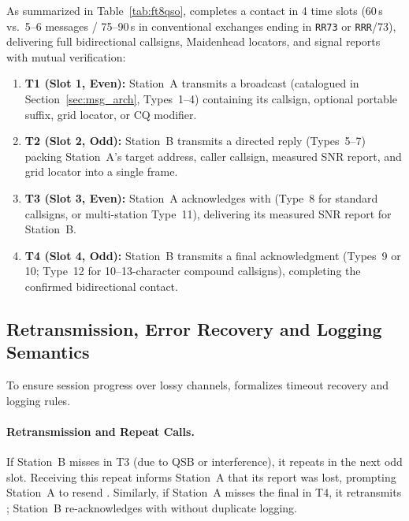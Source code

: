 As summarized in Table~\ref{tab:ft8qso},  completes a contact in 4 time slots (60\,s vs.\ 5--6 messages / 75--90\,s in conventional exchanges ending in \texttt{RR73} or \texttt{RRR}/73), delivering full bidirectional callsigns, Maidenhead locators, and signal reports with mutual verification:
\begin{enumerate}[leftmargin=1.4em, itemsep=0.8pt plus 1.0pt minus 0.4pt, topsep=1.5pt plus 1.0pt minus 0.5pt, parsep=0pt]
  \item \textbf{T1 (Slot 1, Even):} Station~A transmits a  broadcast (catalogued in Section~\ref{sec:msg_arch}, Types~1--4) containing its callsign, optional portable suffix, grid locator, or CQ modifier.
  \item \textbf{T2 (Slot 2, Odd):} Station~B transmits a directed  reply (Types~5--7) packing Station~A's target address, caller callsign, measured SNR report, and grid locator into a single frame.
  \item \textbf{T3 (Slot 3, Even):} Station~A acknowledges with  (Type~8 for standard callsigns, or multi-station Type~11), delivering its measured SNR report for Station~B.
  \item \textbf{T4 (Slot 4, Odd):} Station~B transmits a final  acknowledgment (Types~9 or 10; Type~12 for 10--13-character compound callsigns), completing the confirmed bidirectional contact.
\end{enumerate}

\subsection{Retransmission, Error Recovery and Logging Semantics}
\label{sec:qso:retx}

To ensure session progress over lossy channels, \LQ{} formalizes timeout recovery and logging rules.

\paragraph{Retransmission and Repeat Calls.}
If Station~B misses  in T3 (due to QSB or interference), it repeats  in the next odd slot. Receiving this repeat informs Station~A that its report was lost, prompting Station~A to resend . Similarly, if Station~A misses the final  in T4, it retransmits ; Station~B re-acknowledges with  without duplicate logging.

